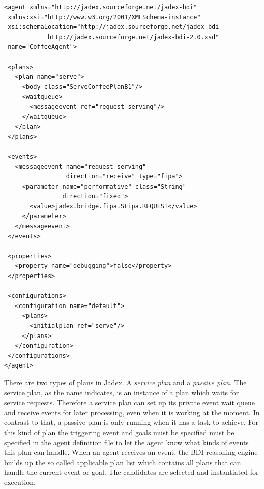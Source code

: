\begin{lstlisting}
<agent xmlns="http://jadex.sourceforge.net/jadex-bdi"
 xmlns:xsi="http://www.w3.org/2001/XMLSchema-instance"
 xsi:schemaLocation="http://jadex.sourceforge.net/jadex-bdi
            http://jadex.sourceforge.net/jadex-bdi-2.0.xsd"
 name="CoffeeAgent">

 <plans>
   <plan name="serve">
     <body class="ServeCoffeePlanB1"/>
     <waitqueue>
       <messageevent ref="request_serving"/>
     </waitqueue>
   </plan>
 </plans>

 <events>
   <messageevent name="request_serving"
                 direction="receive" type="fipa">
     <parameter name="performative" class="String"
                direction="fixed">
       <value>jadex.bridge.fipa.SFipa.REQUEST</value>
     </parameter>
   </messageevent>
 </events>

 <properties>
   <property name="debugging">false</property>
 </properties>

 <configurations>
   <configuration name="default">
     <plans>
       <initialplan ref="serve"/>
     </plans>
   </configuration>
 </configurations>
</agent>
\end{lstlisting}
There are two types of plans in Jadex.
A \emph{service plan} and a \emph{passive plan}.
The service plan, as the name indicates, is an instance of a plan which waits for service requests.
Therefore a service plan can set up its private event wait queue and receive events for later processing, even when it is working at the moment.
In contrast to that, a passive plan is only running when it has a task to achieve.
For this kind of plan the triggering event and goals must be specified must be specified in the agent definition file to let the agent know what kinds of events this plan can handle.
When an agent receives an event, the BDI reasoning engine builds up the so called applicable plan list which contains all plans that can handle the current event or goal.
The candidates are selected and instantiated for execution.

